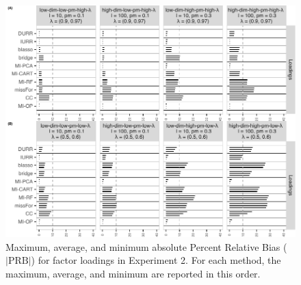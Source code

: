 \begin{figure}
	\includegraphics{../../output/graphs/exp2_CFA_lambda_BPR_summy.pdf}
	\caption{
		Maximum, average, and minimum absolute Percent Relative Bias ($|\text{PRB}|$) for factor loadings
		in Experiment 2.
		For each method, the maximum, average, and minimum are reported in this order.	
		}
\label{fig:exp2fl14}
\end{figure}

\FloatBarrier %

